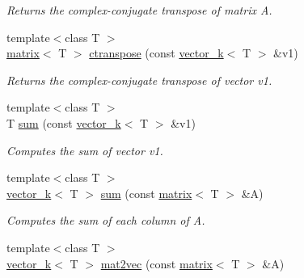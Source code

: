 \begin{DoxyCompactItemize}
\begin{DoxyCompactList}\small\item\em Returns the complex-\/conjugate transpose of matrix A. \end{DoxyCompactList}\item 
\hypertarget{namespacekeycpp_a60ac98094acdd80972dfd34d307489dd}{{\footnotesize template$<$class T $>$ }\\\hyperlink{classkeycpp_1_1matrix}{matrix}$<$ T $>$ \hyperlink{namespacekeycpp_a60ac98094acdd80972dfd34d307489dd}{ctranspose} (const \hyperlink{classkeycpp_1_1vector__k}{vector\-\_\-k}$<$ T $>$ \&v1)}\label{namespacekeycpp_a60ac98094acdd80972dfd34d307489dd}

\begin{DoxyCompactList}\small\item\em Returns the complex-\/conjugate transpose of vector v1. \end{DoxyCompactList}\item 
\hypertarget{namespacekeycpp_a7d3157bfc97800f25010c32280dde212}{{\footnotesize template$<$class T $>$ }\\T \hyperlink{namespacekeycpp_a7d3157bfc97800f25010c32280dde212}{sum} (const \hyperlink{classkeycpp_1_1vector__k}{vector\-\_\-k}$<$ T $>$ \&v1)}\label{namespacekeycpp_a7d3157bfc97800f25010c32280dde212}

\begin{DoxyCompactList}\small\item\em Computes the sum of vector v1. \end{DoxyCompactList}\item 
\hypertarget{namespacekeycpp_a022f7e64d039d6d8289e36edd440fc86}{{\footnotesize template$<$class T $>$ }\\\hyperlink{classkeycpp_1_1vector__k}{vector\-\_\-k}$<$ T $>$ \hyperlink{namespacekeycpp_a022f7e64d039d6d8289e36edd440fc86}{sum} (const \hyperlink{classkeycpp_1_1matrix}{matrix}$<$ T $>$ \&A)}\label{namespacekeycpp_a022f7e64d039d6d8289e36edd440fc86}

\begin{DoxyCompactList}\small\item\em Computes the sum of each column of A. \end{DoxyCompactList}\item 
\hypertarget{namespacekeycpp_a049d8e50ce9c2c5e0b7a0ad95cc559b3}{{\footnotesize template$<$class T $>$ }\\\hyperlink{classkeycpp_1_1vector__k}{vector\-\_\-k}$<$ T $>$ \hyperlink{namespacekeycpp_a049d8e50ce9c2c5e0b7a0ad95cc559b3}{mat2vec} (const \hyperlink{classkeycpp_1_1matrix}{matrix}$<$ T $>$ \&A)}\label{namespacekeycpp_a049d8e50ce9c2c5e0b7a0ad95cc559b3}


\end{DoxyCompactItemize}
